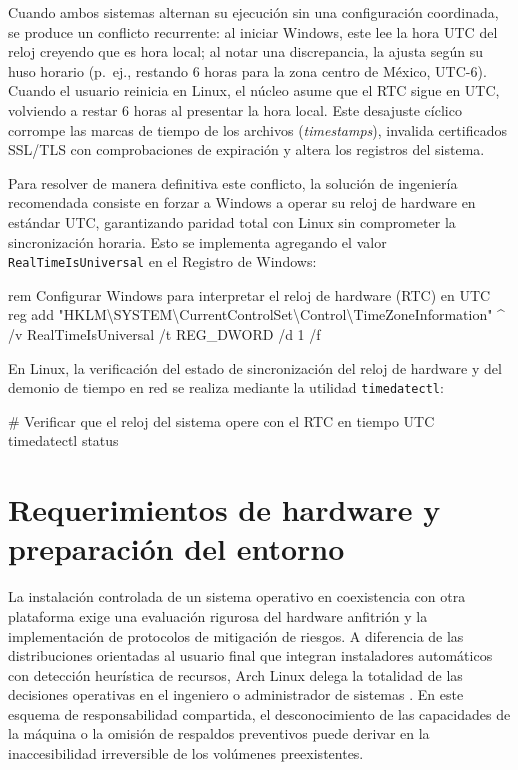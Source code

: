 \documentclass[12pt]{article}
\begin{document}
Cuando ambos sistemas alternan su ejecución sin una configuración coordinada, se produce un conflicto recurrente: al iniciar Windows, este lee la hora UTC del reloj creyendo que es hora local; al notar una discrepancia, la ajusta según su huso horario (p.~ej., restando 6 horas para la zona centro de México, UTC-6). Cuando el usuario reinicia en Linux, el núcleo asume que el RTC sigue en UTC, volviendo a restar 6 horas al presentar la hora local. Este desajuste cíclico corrompe las marcas de tiempo de los archivos (\textit{timestamps}), invalida certificados SSL/TLS con comprobaciones de expiración y altera los registros del sistema.

Para resolver de manera definitiva este conflicto, la solución de ingeniería recomendada consiste en forzar a Windows a operar su reloj de hardware en estándar UTC, garantizando paridad total con Linux sin comprometer la sincronización horaria. Esto se implementa agregando el valor \texttt{RealTimeIsUniversal} en el Registro de Windows:

\begin{mdframed}[style=terminal]
\ttfamily\upshape\color{bashLetterColor}\footnotesize
rem Configurar Windows para interpretar el reloj de hardware (RTC) en UTC \\
reg add "HKLM\textbackslash SYSTEM\textbackslash CurrentControlSet\textbackslash Control\textbackslash TimeZoneInformation" \string^ \\
\hspace*{4ex}/v RealTimeIsUniversal /t REG\_DWORD /d 1 /f
\end{mdframed}

En Linux, la verificación del estado de sincronización del reloj de hardware y del demonio de tiempo en red se realiza mediante la utilidad \texttt{timedatectl}:

\begin{mdframed}[style=terminal]
\ttfamily\upshape\color{bashLetterColor}\footnotesize
\# Verificar que el reloj del sistema opere con el RTC en tiempo UTC \\
timedatectl status
\end{mdframed}

\section{Requerimientos de hardware y preparación del entorno}
\label{sec:requerimientosHardware}

La instalación controlada de un sistema operativo en coexistencia con otra plataforma exige una evaluación rigurosa del hardware anfitrión y la implementación de protocolos de mitigación de riesgos. A diferencia de las distribuciones orientadas al usuario final que integran instaladores automáticos con detección heurística de recursos, Arch Linux delega la totalidad de las decisiones operativas en el ingeniero o administrador de sistemas \parencite{arch2024install}. En este esquema de responsabilidad compartida, el desconocimiento de las capacidades de la máquina o la omisión de respaldos preventivos puede derivar en la inaccesibilidad irreversible de los volúmenes preexistentes.
\end{document}
